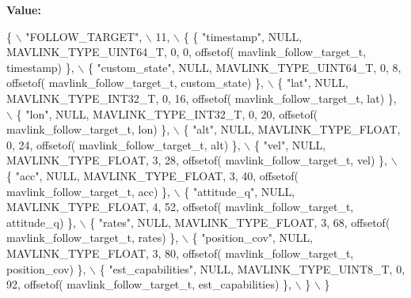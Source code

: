 {\bfseries Value\+:}
\begin{DoxyCode}
\{ \(\backslash\)
    \textcolor{stringliteral}{"FOLLOW\_TARGET"}, \(\backslash\)
    11, \(\backslash\)
    \{  \{ \textcolor{stringliteral}{"timestamp"}, NULL, MAVLINK_TYPE_UINT64_T, 0, 0, offsetof(
      mavlink_follow_target_t, timestamp) \}, \(\backslash\)
         \{ \textcolor{stringliteral}{"custom\_state"}, NULL, MAVLINK_TYPE_UINT64_T, 0, 8, offsetof(
      mavlink_follow_target_t, custom\_state) \}, \(\backslash\)
         \{ \textcolor{stringliteral}{"lat"}, NULL, MAVLINK_TYPE_INT32_T, 0, 16, offsetof(
      mavlink_follow_target_t, lat) \}, \(\backslash\)
         \{ \textcolor{stringliteral}{"lon"}, NULL, MAVLINK_TYPE_INT32_T, 0, 20, offsetof(
      mavlink_follow_target_t, lon) \}, \(\backslash\)
         \{ \textcolor{stringliteral}{"alt"}, NULL, MAVLINK_TYPE_FLOAT, 0, 24, offsetof(
      mavlink_follow_target_t, alt) \}, \(\backslash\)
         \{ \textcolor{stringliteral}{"vel"}, NULL, MAVLINK_TYPE_FLOAT, 3, 28, offsetof(
      mavlink_follow_target_t, vel) \}, \(\backslash\)
         \{ \textcolor{stringliteral}{"acc"}, NULL, MAVLINK_TYPE_FLOAT, 3, 40, offsetof(
      mavlink_follow_target_t, acc) \}, \(\backslash\)
         \{ \textcolor{stringliteral}{"attitude\_q"}, NULL, MAVLINK_TYPE_FLOAT, 4, 52, offsetof(
      mavlink_follow_target_t, attitude\_q) \}, \(\backslash\)
         \{ \textcolor{stringliteral}{"rates"}, NULL, MAVLINK_TYPE_FLOAT, 3, 68, offsetof(
      mavlink_follow_target_t, rates) \}, \(\backslash\)
         \{ \textcolor{stringliteral}{"position\_cov"}, NULL, MAVLINK_TYPE_FLOAT, 3, 80, offsetof(
      mavlink_follow_target_t, position\_cov) \}, \(\backslash\)
         \{ \textcolor{stringliteral}{"est\_capabilities"}, NULL, MAVLINK_TYPE_UINT8_T, 0, 92, offsetof(
      mavlink_follow_target_t, est\_capabilities) \}, \(\backslash\)
         \} \(\backslash\)
\}
\end{DoxyCode}
\mbox{\label{mavlink__msg__follow__target_8h_a99aa83cf8f5ebfb2a8817e6b3ebbc325}} 
